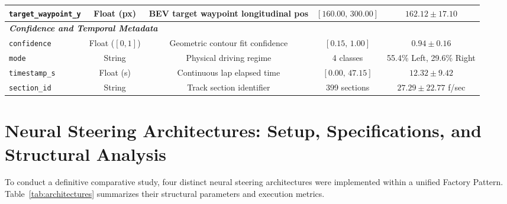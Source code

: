 \documentclass[10pt,journal,compsoc]{IEEEtran}
\begin{document}
\begin{table}[h]
{\begin{tabular}{lcccc}
\texttt{target\_waypoint\_y} & Float (px) & BEV target waypoint longitudinal pos & $[160.00, \, 300.00]$ & $162.12 \pm 17.10$ \\
\midrule
\multicolumn{5}{l}{\textit{\textbf{Confidence and Temporal Metadata}}} \\
\texttt{confidence} & Float ($[0, 1]$) & Geometric contour fit confidence & $[0.15, \, 1.00]$ & $0.94 \pm 0.16$ \\
\texttt{mode} & String & Physical driving regime & 4 classes & 55.4\% Left, 29.6\% Right \\
\texttt{timestamp\_s} & Float (s) & Continuous lap elapsed time & $[0.00, \, 47.15]$ & $12.32 \pm 9.42$ \\
\texttt{section\_id} & String & Track section identifier & 399 sections & $27.29 \pm 22.77$ f/sec \\
\bottomrule
\end{tabular}%
}
\end{table}

\section{Neural Steering Architectures: Setup, Specifications, and Structural Analysis}
\label{sec:architectures}

To conduct a definitive comparative study, four distinct neural steering architectures were implemented within a unified Factory Pattern. Table~\ref{tab:architectures} summarizes their structural parameters and execution metrics.
\end{document}
